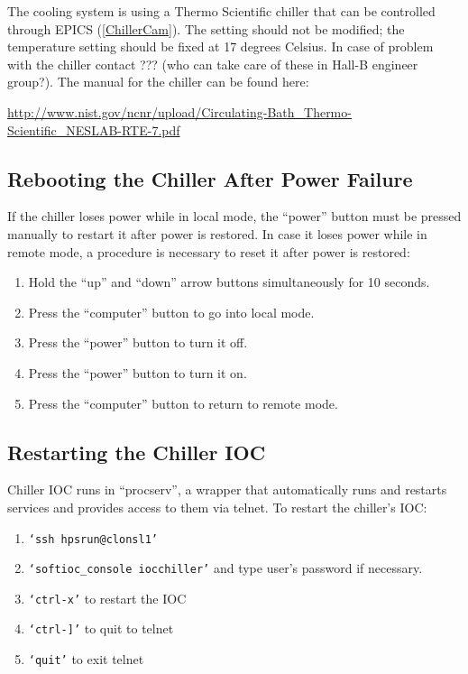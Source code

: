 \documentclass[12pt]{article}
\begin{document}
{   The cooling system is using a Thermo Scientific chiller that can be controlled through EPICS (\ref{ChillerCam}). The setting should not be modified; the temperature setting should be fixed at 17 degrees Celsius. In case of problem with the chiller contact ??? (who can take care of these in Hall-B engineer group?).  The manual for the chiller can be found here:

   {\noindent\footnotesize\url{http://www.nist.gov/ncnr/upload/Circulating-Bath\_Thermo-Scientific\_NESLAB-RTE-7.pdf}}
     \subsection{Rebooting the Chiller After Power Failure}
     If the chiller loses power while in local mode, the ``power'' button must be pressed manually to restart it after power is restored.  In case it loses power while in remote mode, a procedure is necessary to reset it after power is restored:
   {\footnotesize
     \begin{enumerate}
         \item Hold the ``up'' and ``down'' arrow buttons simultaneously for 10 seconds.
         \item Press the ``computer'' button to go into local mode.
         \item Press the ``power'' button to turn it off.
         \item Press the ``power'' button to turn it on.
         \item Press the ``computer'' button to return to remote mode.
    \end{enumerate}
    }

    \subsection{Restarting the Chiller IOC}
    Chiller IOC runs in ``procserv'', a wrapper that automatically runs and restarts services and provides access to them via telnet.  To restart the chiller's IOC:
   {\footnotesize
   \begin{enumerate}
       \item \texttt{`ssh hpsrun@clonsl1'}
       \item \texttt{`softioc\_console iocchiller'} and type user's password if necessary.
       \item \texttt{`ctrl-x'} to restart the IOC
       \item \texttt{`ctrl-]'} to quit to telnet
       \item \texttt{`quit'} to exit telnet
   \end{enumerate}
   }

}
\end{document}
